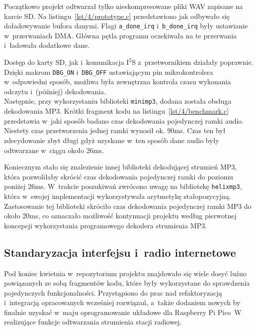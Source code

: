 \documentclass[polish]{aghengthesis}
\newcommand{\isqs}{$\text{I}^{2}\text{S}$}
\newcommand{\lstfile}[3]{
	\noindent
	\hspace{0.1\linewidth}
	\begin{minipage}{0.8\linewidth}
		
	\end{minipage}
	\vspace{0.3cm}
}
\begin{document}
			Początkowo projekt odtwarzał tylko nieskompresowane pliki WAV zapisane na karcie SD. Na listingu~\ref{lst/4/prototype.c} przedstawiono jak odbywało się doładowywanie bufora danymi. Flagi \lstinline|a_done_irq| i~\lstinline|b_done_irq| były ustawianie w~przerwaniach DMA. Główna pętla programu oczekiwała na te przerwania i~ładowała dodatkowe dane.
			
			\lstfile{c}{Realizacja podstawowego ładowania bufora}{lst/4/prototype.c}
			
			Dostęp do karty SD, jak i~komunikacja \isqs{} z~przetwornikiem działały poprawnie. Dzięki makrom \lstinline|DBG_ON| i~\lstinline|DBG_OFF| ustawiającym pin mikrokontrolera w~odpowiedni sposób, możliwa była zewnętrzna kontrola czasu wykonania odczytu i~(później) dekodowania.
			$ $\\
			
			Następnie, przy wykorzystaniu biblioteki \lstinline|minimp3|\textsuperscript{\cite{minimp3}}, dodana została obsługa dekodowania MP3. Krótki fragment kodu na listingu~\ref{lst/4/benchmark.c} przedstawia w~jaki sposób badano czas dekodowania pojedynczej ramki audio. Niestety czas przetworzenia jednej ramki wynosił ok. 90ms.
			Czas ten był zdecydowanie zbyt długi gdyż uzyskane w~ten sposób dane audio  były odtwarzane w~ciągu około 26ms.

			\lstfile{c}{Pomiar czasu dekodowania ramki MP3}{lst/4/benchmark.c}
			
			Koniecznym stało się znalezienie innej biblioteki dekodującej strumień MP3, która pozwoliłaby skrócić czas dekodowania pojedynczej ramki do poziomu poniżej 26ms. W~trakcie poszukiwań zwrócono uwagę na bibliotekę \lstinline|helixmp3|, która w~swojej implementacji wykorzystywała arytmetykę stałopozycyjną. Zastosowanie tej biblioteki skróciło czas dekodowania pojedynczej ramki MP3 do około 20ms, co oznaczało możliwość kontynuacji projektu według pierwotnej koncepcji wykorzystania programowego dekodera strumienia MP3.
			
		\subsection{Standaryzacja interfejsu i~radio internetowe}
			Pod koniec kwietnia w~repozytorium projektu znajdowało się wiele dosyć luźno powiązanych ze sobą fragmentów kodu, które były wykorzystane do sprawdzenia pojedynczych funkcjonalności.
			Przystąpiono do prac nad refaktoryzacją i~integracją opracowanych wcześniej rozwiązań, a~także dodaniem nowych by finalnie uzyskać w~maju oprogramowanie układowe dla Raspberry Pi Pico~W realizujące funkcje odtwarzania strumienia stacji radiowej.
			$ $\\
			
\end{document}
